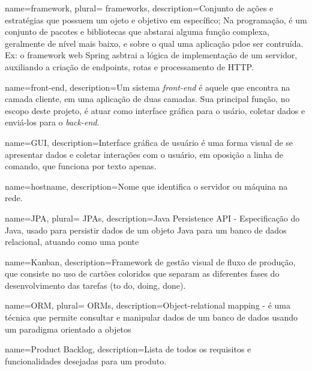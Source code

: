  {
    name=framework,
    plural= {frameworks},
    description={Conjunto de ações e estratégias que possuem um ojeto e objetivo em específico;
    Na programação, é um conjunto de pacotes e bibliotecas que abstarai
    alguma função complexa, geralmente de nível mais baixo, e sobre o
    qual uma aplicação pdoe ser contruída. Ex: o framework web Spring
    asbtrai a lógica de implementação de um servidor, auxiliando a
    criação de endpoints, rotas e processamento de HTTP.}
}

 {
    name={front-end},
    description={Um sistema \emph{front-end} é aquele que encontra na
    camada cliente, em uma aplicação de duas camadas. Sua
    principal função, no escopo deste projeto, é atuar como interface
    gráfica para o usário, coletar dados e enviá-los para o \emph{back-end}.}
}

 {
    name=GUI,
    description={Interface gráfica de usuário é uma forma visual de se
    apresentar dados e coletar interações com o usuário, em oposição a
    linha de comando, que funciona por texto apenas.}
}

 {
    name=hostname,
    description={Nome que identifica o servidor ou máquina na rede.}
}

 {
    name=JPA,
    plural= {JPAs},
    description={Java Persistence API - Especificação do Java, usado para persistir dados de um objeto Java para um banco de dados relacional, atuando como uma ponte}
}

 {
    name=Kanban,
    description={Framework de gestão visual de fluxo de produção, que consiste no uso de cartões coloridos que separam as diferentes fases do desenvolvimento das tarefas (to do, doing, done).}
}


 {
    name=ORM,
    plural= {ORMs},
    description={Object-relational mapping - é uma técnica que permite consultar 	e manipular dados de um banco de dados usando um paradigma orientado a 				objetos}
}

 {
    name={Product Backlog},
    description={Lista de todos os requisitos e funcionalidades desejadas para um produto.}
}

